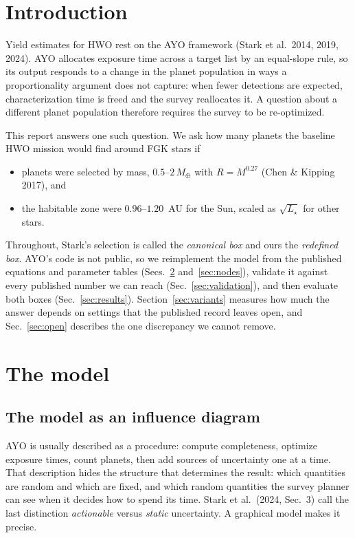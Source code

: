 \documentclass[11pt,a4paper]{article}
\begin{document}
\section{Introduction}
\label{sec:intro}

Yield estimates for HWO rest on the AYO framework (Stark et al.\ 2014, 2019, 2024). AYO allocates
exposure time across a target list by an equal-slope rule, so its output responds to a change in
the planet population in ways a proportionality argument does not capture: when fewer detections
are expected, characterization time is freed and the survey reallocates it. A question about a
different planet population therefore requires the survey to be re-optimized.

This report answers one such question. We ask how many planets the baseline HWO mission would find
around FGK stars if
\begin{itemize}
\item planets were selected by mass, $0.5$--$2\,M_\oplus$ with $R = M^{0.27}$ (Chen \& Kipping
2017), and
\item the habitable zone were $0.96$--$1.20$~AU for the Sun, scaled as $\sqrt{L_\star}$ for other
stars.
\end{itemize}
Throughout, Stark's selection is called the \emph{canonical box} and ours the \emph{redefined
box}. AYO's code is not public, so we reimplement the model from the published equations and
parameter tables (Secs.~\ref{sec:model} and~\ref{sec:nodes}), validate it against every published
number we can reach (Sec.~\ref{sec:validation}), and then evaluate both boxes
(Sec.~\ref{sec:results}). Section~\ref{sec:variants} measures how much the answer depends on
settings that the published record leaves open, and Sec.~\ref{sec:open} describes the one
discrepancy we cannot remove.

\section{The model}
\label{sec:model}

\subsection{The model as an influence diagram}

AYO is usually described as a procedure: compute completeness, optimize exposure times, count
planets, then add sources of uncertainty one at a time. That description hides the structure that
determines the result: which quantities are random and which are fixed, and which random
quantities the survey planner can see when it decides how to spend its time. Stark et al.\ (2024,
Sec.~3) call the last distinction \emph{actionable} versus \emph{static} uncertainty. A graphical
model makes it precise.
\end{document}
